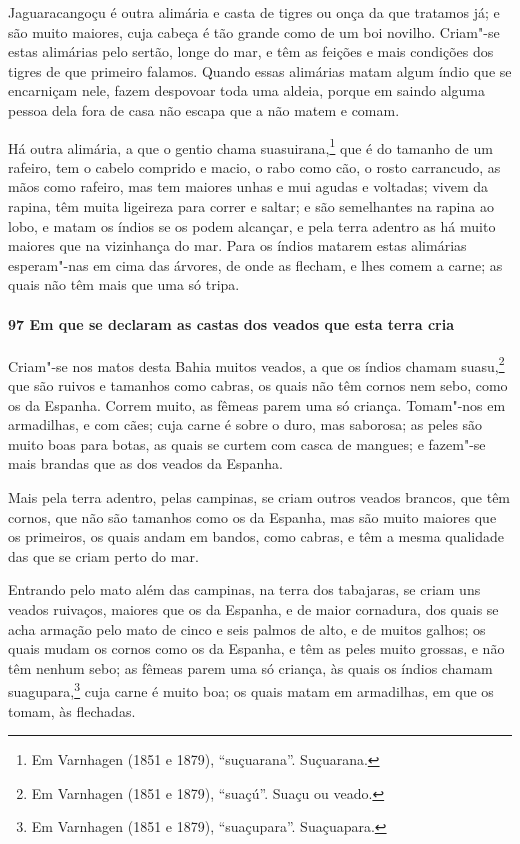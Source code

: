 Jaguaracangoçu é outra alimária e casta de tigres ou onça da que tratamos já; e são muito
maiores, cuja cabeça é tão grande como de um boi novilho. Criam"-se estas alimárias pelo
sertão, longe do mar, e têm as feições e mais condições dos tigres de que primeiro
falamos. Quando essas alimárias matam algum índio que se encarniçam nele, fazem despovoar
toda uma aldeia, porque em saindo alguma pessoa dela fora de casa não escapa que a não
matem e comam.

Há outra alimária, a que o gentio chama suasuirana,\footnote{ Em Varnhagen (1851 e 1879),
``suçuarana''. Suçuarana.} que é do tamanho de um rafeiro, tem o cabelo comprido e macio,
o rabo como cão, o rosto carrancudo, as mãos como rafeiro, mas tem maiores unhas e mui
agudas e voltadas; vivem da rapina, têm muita ligeireza para correr e saltar; e são
semelhantes na rapina ao lobo, e matam os índios se os podem alcançar, e pela terra
adentro as há muito maiores que na vizinhança do mar. Para os índios matarem estas
alimárias esperam"-nas em cima das árvores, de onde as flecham, e lhes comem a carne; as
quais não têm mais que uma só tripa.

\paragraph{97 Em que se declaram as castas dos veados que esta terra cria}

Criam"-se nos matos desta Bahia muitos veados, a que os índios chamam suasu,\footnote{ Em
Varnhagen (1851 e 1879), ``suaçú''. Suaçu ou veado.} que são ruivos e tamanhos como
cabras, os quais não têm cornos nem sebo, como os da Espanha. Correm muito, as fêmeas
parem uma só criança. Tomam"-nos em armadilhas, e com cães; cuja carne é sobre o duro, mas
saborosa; as peles são muito boas para botas, as quais se curtem com casca de mangues; e
fazem"-se mais brandas que as dos veados da Espanha.

Mais pela terra adentro, pelas campinas, se criam outros veados brancos, que têm cornos,
que não são tamanhos como os da Espanha, mas são muito maiores que os primeiros, os quais
andam em bandos, como cabras, e têm a mesma qualidade das que se criam perto do mar.

Entrando pelo mato além das campinas, na terra dos tabajaras, se criam uns veados
ruivaços, maiores que os da Espanha, e de maior cornadura, dos quais se acha armação pelo
mato de cinco e seis palmos de alto, e de muitos galhos; os quais mudam os cornos como os
da Espanha, e têm as peles muito grossas, e não têm nenhum sebo; as fêmeas parem uma só
criança, às quais os índios chamam suagupara,\footnote{ Em Varnhagen (1851 e 1879),
``suaçupara''. Suaçuapara.} cuja carne é muito boa; os quais matam em armadilhas, em que
os tomam, às flechadas.

